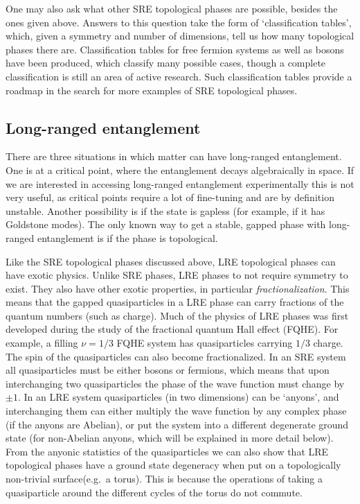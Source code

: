 One may also ask what other SRE topological phases are possible, besides the ones given above. Answers to this question take the form of `classification tables', which, given a symmetry and number of dimensions, tell us how many topological phases there are. Classification tables for free fermion systems\cite{KitaevClass,Ludwig} as well as bosons\cite{WenScience,WenPRB,KapustinThorngren} have been produced, which classify many possible cases, though a complete classification is still an area of active research. Such classification tables provide a roadmap in the search for more examples of SRE topological phases.

\subsection{Long-ranged entanglement}
\label{subsec::LRE}

There are three situations in which matter can have long-ranged entanglement. One is at a critical point, where the entanglement decays algebraically in space. If we are interested in accessing long-ranged entanglement experimentally this is not very useful, as critical points require a lot of fine-tuning and are by definition unstable. Another possibility is if the state is gapless (for example, if it has Goldstone modes). The only known way to get a stable, gapped phase with long-ranged entanglement is if the phase is topological. 

Like the SRE topological phases discussed above, LRE topological phases can have exotic physics. Unlike SRE phases, LRE phases to not require symmetry to exist. They also have other exotic properties, in particular \emph{fractionalization}. This means that the gapped quasiparticles in a LRE phase can carry fractions of the quantum numbers (such as charge). Much of the physics of LRE phases was first developed during the study of the fractional quantum Hall effect (FQHE). For example, a filling $\nu=1/3$ FQHE system has quasiparticles carrying $1/3$ charge\cite{Laughlin-PhysRevLett.50.1395}. The spin of the quasiparticles can also become fractionalized. In an SRE system all quasiparticles must be either bosons or fermions, which means that upon interchanging two quasiparticles the phase of the wave function must change by $\pm 1$. In an LRE system quasiparticles (in two dimensions) can be `anyons', and interchanging them can either multiply the wave function by any complex phase\cite{LeinaasMyrheim, Arovas-Schrieffer-Wilczek} (if the anyons are Abelian), or put the system into a different degenerate ground state (for non-Abelian anyons, which will be explained in more detail below). 
From the anyonic statistics of the quasiparticles we can also show that LRE topological phases have a ground state degeneracy when put on a topologically non-trivial surface(e.g.~a torus). This is because the operations of taking a quasiparticle around the different cycles of the torus do not commute.

